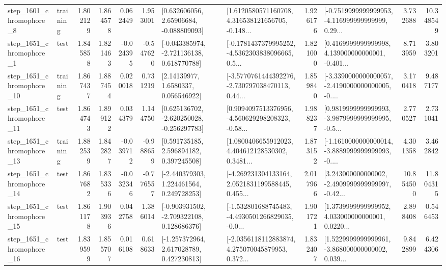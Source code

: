 \begin{tabular}{llrrrrllrlrr}
  step\_1601\_chromophore\_8 &  training &      1.802129 &    1.864578 &      0.062449 &  1.953001 &     [0.632606056, 2.65906684, -0.088809093] &  [1.6120580571160708, 4.316538121656705, -0.148... &       1.926176 &  [-0.7519999999999953, -4.116999999999999, 0.29... &            3.732688 &         10.348549 \\
  step\_1651\_chromophore\_1 &      test &      1.845858 &    1.821463 &     -0.024395 & -0.547620 &   [-0.043385974, -2.721136138, 0.618770788] &  [-0.1781437379995252, -4.5362303838096665, 0.5... &       1.821000 &  [0.4169999999999998, 4.139000000000001, -0.401... &            8.713959 &          3.803201 \\
 step\_1651\_chromophore\_10 &  training &      1.867437 &    1.887454 &      0.020018 &  0.731219 &        [2.14139977, 1.6580337, 0.056546922] &  [-3.5770761444392276, -2.730797038470113, 0.44... &       1.859840 &  [-3.3390000000000057, -2.4190000000000005, -0.... &            3.170418 &          9.487177 \\
 step\_1651\_chromophore\_11 &      test &      1.864743 &    1.899122 &      0.034379 &  1.144750 &   [0.625136702, -2.620250028, -0.256297783] &  [0.9094097513376956, -4.560629298208323, -0.58... &       1.988237 &  [0.9819999999999993, -3.9879999999999995, -0.5... &            2.770527 &          2.731041 \\
 step\_1651\_chromophore\_13 &  training &      1.882539 &    1.842827 &     -0.039712 & -0.988659 &     [0.591735185, 2.596894182, 0.397245508] &  [1.0800406655912023, 4.404612128530302, 0.3481... &       1.873152 &  [-1.1610000000000014, -3.8889999999999993, -0.... &            4.301358 &          3.462842 \\
 step\_1651\_chromophore\_14 &      test &      1.867682 &    1.835336 &     -0.032346 & -0.776557 &    [-2.440379303, 1.224461564, 0.249728253] &  [-4.269231304133164, 2.0521831199588445, 0.455... &       2.017966 &  [3.243000000000002, -2.4909999999999997, -0.42... &           10.854500 &         11.804315 \\
 step\_1651\_chromophore\_15 &      test &      1.861178 &    1.903936 &      0.042758 &  1.386014 &   [-0.903931502, -2.709322108, 0.128686376] &  [-1.532801688745483, -4.4930501266829035, -0.0... &       1.901721 &  [1.3739999999999952, 4.033000000000001, 0.0220... &            2.898408 &          0.546453 \\
 step\_1651\_chromophore\_16 &      test &      1.839599 &    1.855707 &      0.016108 &  0.618633 &    [-1.257372964, 2.617028789, 0.427230813] &  [-2.0356118112883874, 4.275070045879953, 0.372... &       1.832407 &  [1.5229999999999961, -3.868000000000002, 0.039... &            9.842899 &          6.424306 \\

\end{tabular}
